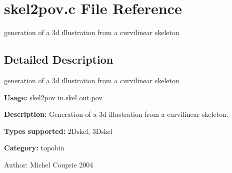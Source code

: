 \section{skel2pov.c File Reference}
\label{skel2pov_8c}
generation of a 3d illustration from a curvilinear skeleton  




\label{_details}
\subsection{Detailed Description}
generation of a 3d illustration from a curvilinear skeleton 

{\bf Usage:} skel2pov in.skel out.pov

{\bf Description:} Generation of a 3d illustration from a curvilinear skeleton.

{\bf Types supported:} 2Dskel, 3Dskel

{\bf Category:} topobin

\begin{Desc}
\item[Author:]Michel Couprie 2004 \end{Desc}
